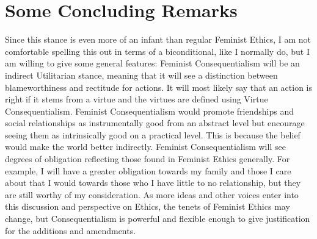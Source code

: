\section{Some Concluding Remarks}

Since this stance is even more of an infant than regular Feminist Ethics, I am not comfortable spelling this out in terms of a biconditional, like I normally do, but I am willing to give some general features: Feminist Consequentialism will be an indirect Utilitarian stance, meaning that it will see a distinction between blameworthiness and rectitude for actions. It will most likely say that an action is right if it stems from a virtue and the virtues are defined using Virtue Consequentialism. Feminist Consequentialism would promote friendships and social relationships as instrumentally good from an abstract level but encourage seeing them as intrinsically good on a practical level. This is because the belief would make the world better indirectly. Feminist Consequentialism will see degrees of obligation reflecting those found in Feminist Ethics generally. For example, I will have a greater obligation towards my family and those I care about that I would towards those who I have little to no relationship, but they are still worthy of my consideration. As more ideas and other voices enter into this discussion and perspective on Ethics, the tenets of Feminist Ethics may change, but Consequentialism is powerful and flexible enough to give justification for the additions and amendments. 


